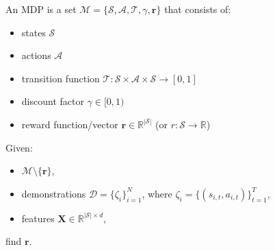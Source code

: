 \documentclass{beamer}
\begin{document}
\begin{frame}
  \begin{definition}
    An MDP is a set $\mathcal{M} = \{\mathcal{S}, \mathcal{A}, \mathcal{T},
    \gamma, \mathbf{r} \}$ that consists of:
    \begin{itemize}
    \item states $\mathcal{S}$
    \item actions $\mathcal{A}$
    \item transition function $\mathcal{T} \colon \mathcal{S} \times \mathcal{A}
      \times \mathcal{S} \to [0, 1]$
    \item discount factor $\gamma \in [0, 1)$
    \item reward function/vector $\mathbf{r} \in \mathbb{R}^{|\mathcal{S}|}$ (or
      $r \colon \mathcal{S} \to \mathbb{R}$)
    \end{itemize}
  \end{definition}
  \pause
  \begin{definition}
    Given:
    \begin{itemize}
    \item $\mathcal{M} \setminus \{ \mathbf{r} \}$,
    \item demonstrations $\mathcal{D} = \{ \zeta_i \}_{i=1}^N$, where $\zeta_i =
      \{ (s_{i,t}, a_{i,t}) \}_{t=1}^T$,
    \item features $\mathbf{X} \in \mathbb{R}^{|\mathcal{S}| \times d}$,
    \end{itemize}
    find $\mathbf{r}$.
  \end{definition}
\end{frame}
\end{document}

